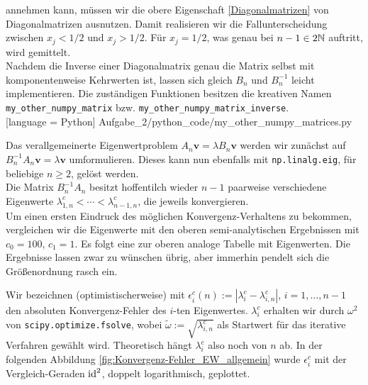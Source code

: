 annehmen kann, müssen wir die obere Eigenschaft \eqref{Diagonalmatrizen} von Diagonalmatrizen ausnutzen. Damit realisieren wir die Fallunterscheidung zwischen $x_j < 1/2$ und $x_j > 1/2$. Für $x_j = 1/2$, was genau bei $n-1 \in 2 \mathbb{N}$ auftritt, wird gemittelt. \\

Nachdem die Inverse einer Diagonalmatrix genau die Matrix selbst mit komponentenweise Kehrwerten ist, lassen sich gleich $B_n$ und $B_n^{-1}$ leicht implementieren. Die zuständigen Funktionen besitzen die kreativen Namen \verb|my_other_numpy_matrix| bzw. \verb|my_other_numpy_matrix_inverse|. \\


[language = Python]
{Aufgabe_2/python_code/my_other_numpy_matrices.py}
\vspace{10pt}

Das verallgemeinerte Eigenwertproblem $A_n \mathbf{v} = \lambda B_n \mathbf{v}$ werden wir zunächst auf $B_n^{-1} A_n \mathbf{v} = \lambda \mathbf{v}$ umformulieren. Dieses kann nun ebenfalls mit \verb|np.linalg.eig|, für beliebige $n \geq 2$, gelöst werden. \\

Die Matrix $B_n^{-1} A_n$ besitzt hoffentilch wieder $n-1$ paarweise verschiedene Eigenwerte $\lambda^c_{1, n} < \cdots < \lambda^c_{n-1, n}$, die jeweils konvergieren. \\

Um einen ersten Eindruck des möglichen Konvergenz-Verhaltens zu bekommen, vergleichen wir die Eigenwerte mit den oberen semi-analytischen Ergebnissen mit $c_0 = 100$, $c_1 = 1$. Es folgt eine zur oberen analoge Tabelle mit Eigenwerten. Die Ergebnisse lassen zwar zu wünschen übrig, aber immerhin pendelt sich die Größenordnung rasch ein. \\

\begin{center}


\vspace{10pt}
\end{center}

Wir bezeichnen (optimistischerweise) mit $\epsilon_i^c(n) := |\lambda_i^c - \lambda_{i, n}^c|$, $i = 1, \ldots, n-1$ den absoluten Konvergenz-Fehler des $i$-ten Eigenwertes. $\lambda_i^c$ erhalten wir durch $\omega^2$ von \verb|scipy.optimize.fsolve|, wobei $\tilde{\omega} := \sqrt{\lambda_{i, n}^c}$ als Startwert für das iterative Verfahren gewählt wird. Theoretisch hängt $\lambda_i^c$ also noch von $n$ ab. In der folgenden Abbildung \ref{fig:Konvergenz-Fehler_EW_allgemein} wurde $\epsilon^c_i$ mit der Vergleich-Geraden $\mathrm{id}^2$, doppelt logarithmisch, geplottet. \\

